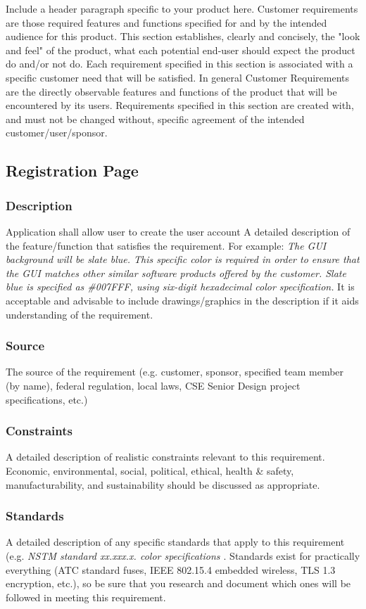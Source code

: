 Include a header paragraph specific to your product here. Customer requirements are those required features and functions specified for and by the intended audience for this product. This section establishes, clearly and concisely, the "look and feel" of the product, what each potential end-user should expect the product do and/or not do. Each requirement specified in this section is associated with a specific customer need that will be satisfied. In general Customer Requirements are the directly observable features and functions of the product that will be encountered by its users. Requirements specified in this section are created with, and must not be changed without, specific agreement of the intended customer/user/sponsor.

\subsection{Registration Page}
\subsubsection{Description}
Application shall allow user to create the user account
A detailed description of the feature/function that satisfies the requirement. For example: \textit{The GUI background will be slate blue. This specific color is required in order to ensure that the GUI matches other similar software products offered by the customer. Slate blue is specified as \#007FFF, using six-digit hexadecimal color specification.} It is acceptable and advisable to include drawings/graphics in the description if it aids understanding of the requirement.
\subsubsection{Source}
The source of the requirement (e.g. customer, sponsor, specified team member (by name), federal regulation, local laws, CSE Senior Design project specifications, etc.)
\subsubsection{Constraints}
A detailed description of realistic constraints relevant to this requirement. Economic, environmental, social, political, ethical, health \& safety, manufacturability, and sustainability should be discussed as appropriate.
\subsubsection{Standards}
A detailed description of any specific standards that apply to this requirement (e.g. \textit{NSTM standard xx.xxx.x. color specifications \cite{Rubin2012}}. Standards exist for practically everything (ATC standard fuses, IEEE 802.15.4 embedded wireless, TLS 1.3 encryption, etc.), so be sure that you research and document which ones will be followed in meeting this requirement.
